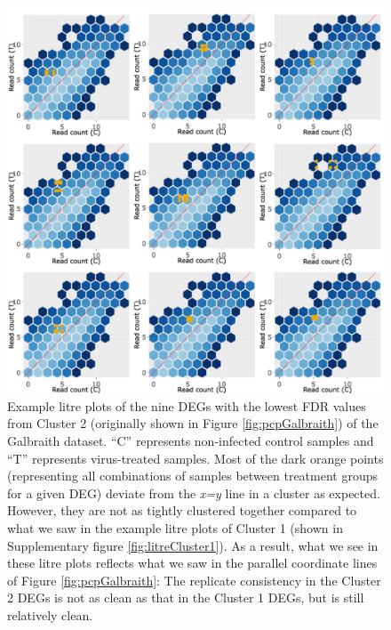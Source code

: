 \documentclass[11pt,a4paper,oldfontcommands,openany]{memoir}
\numberwithin{equation}{section} %
\begin{document}
\begin{figure}[H]
\begin{framed}
  \includegraphics[width=\textwidth]{Images/litreCluster2}
\end{framed}
  \caption{Example litre plots of the nine DEGs with the lowest FDR values from Cluster 2 (originally shown in Figure \ref{fig:pcpGalbraith}) of the Galbraith dataset. ``C'' represents non-infected control samples and ``T'' represents virus-treated samples. Most of the dark orange points (representing all combinations of samples between treatment groups for a given DEG) deviate from the \textit{x=y} line in a cluster as expected. However, they are not as tightly clustered together compared to what we saw in the example litre plots of Cluster 1 (shown in Supplementary figure \ref{fig:litreCluster1}). As a result, what we see in these litre plots reflects what we saw in the parallel coordinate lines of Figure \ref{fig:pcpGalbraith}: The replicate consistency in the Cluster 2 DEGs is not as clean as that in the Cluster 1 DEGs, but is still relatively clean.}
  \label{fig:litreCluster2}
\end{figure}
\end{document}

